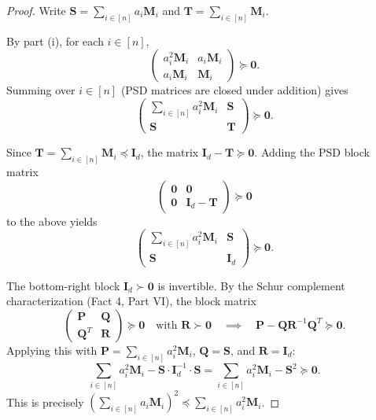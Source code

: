 \begin{proof}
Write $\mathbf{S} = \sum_{i \in [n]} a_i \mathbf{M}_i$ and $\mathbf{T} = \sum_{i \in [n]} \mathbf{M}_i$.

By part (i), for each $i \in [n]$,
\[
\begin{pmatrix} a_i^2 \mathbf{M}_i & a_i \mathbf{M}_i \\ a_i \mathbf{M}_i & \mathbf{M}_i \end{pmatrix} \succeq \mathbf{0}.
\]
Summing over $i \in [n]$ (PSD matrices are closed under addition) gives
\[
\begin{pmatrix} \sum_{i \in [n]} a_i^2 \mathbf{M}_i & \mathbf{S} \\ \mathbf{S} & \mathbf{T} \end{pmatrix} \succeq \mathbf{0}.
\]

Since $\mathbf{T} = \sum_{i \in [n]} \mathbf{M}_i \preceq \mathbf{I}_d$, the matrix $\mathbf{I}_d - \mathbf{T} \succeq \mathbf{0}$. Adding the PSD block matrix
\[
\begin{pmatrix} \mathbf{0} & \mathbf{0} \\ \mathbf{0} & \mathbf{I}_d - \mathbf{T} \end{pmatrix} \succeq \mathbf{0}
\]
to the above yields
\[
\begin{pmatrix} \sum_{i \in [n]} a_i^2 \mathbf{M}_i & \mathbf{S} \\ \mathbf{S} & \mathbf{I}_d \end{pmatrix} \succeq \mathbf{0}.
\]

The bottom-right block $\mathbf{I}_d \succ \mathbf{0}$ is invertible. By the Schur complement characterization (Fact 4, Part VI), the block matrix
\[
\begin{pmatrix} \mathbf{P} & \mathbf{Q} \\ \mathbf{Q}^T & \mathbf{R} \end{pmatrix} \succeq \mathbf{0} \quad \text{with } \mathbf{R} \succ \mathbf{0} \quad \implies \quad \mathbf{P} - \mathbf{Q}\mathbf{R}^{-1}\mathbf{Q}^T \succeq \mathbf{0}.
\]
Applying this with $\mathbf{P} = \sum_{i \in [n]} a_i^2 \mathbf{M}_i$, $\mathbf{Q} = \mathbf{S}$, and $\mathbf{R} = \mathbf{I}_d$:
\[
\sum_{i \in [n]} a_i^2 \mathbf{M}_i - \mathbf{S} \cdot \mathbf{I}_d^{-1} \cdot \mathbf{S} = \sum_{i \in [n]} a_i^2 \mathbf{M}_i - \mathbf{S}^2 \succeq \mathbf{0}.
\]
This is precisely $\left(\sum_{i \in [n]} a_i \mathbf{M}_i\right)^2 \preceq \sum_{i \in [n]} a_i^2 \mathbf{M}_i$.
\end{proof}
